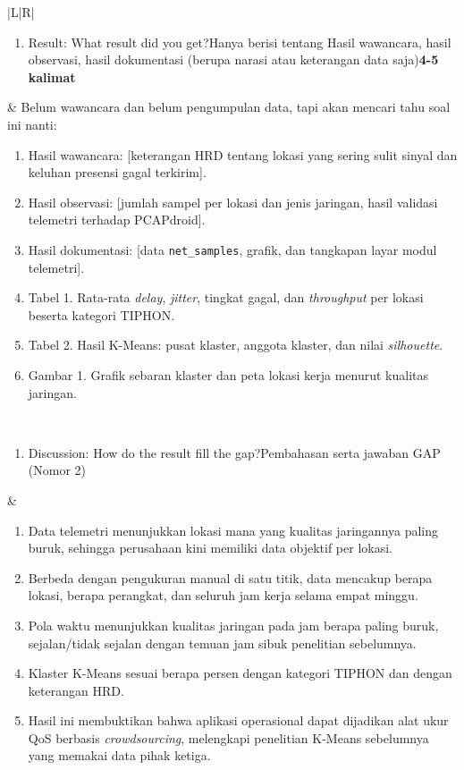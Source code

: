 \documentclass[11pt,a4paper]{article}
\begin{document}
\begin{longtable}{|L|R|}
\begin{enumerate}[label=\arabic*.,start=5]
\item Result: What result did you get?\newline Hanya berisi tentang Hasil wawancara, hasil observasi, hasil dokumentasi (berupa narasi atau keterangan data saja)\newline \textbf{4-5 kalimat}
\end{enumerate}
&
Belum wawancara dan belum pengumpulan data, tapi akan mencari tahu soal ini nanti:
\begin{enumerate}[label=\arabic*.]
\item Hasil wawancara: [keterangan HRD tentang lokasi yang sering sulit sinyal dan keluhan presensi gagal terkirim].
\item Hasil observasi: [jumlah sampel per lokasi dan jenis jaringan, hasil validasi telemetri terhadap PCAPdroid].
\item Hasil dokumentasi: [data \texttt{net\_samples}, grafik, dan tangkapan layar modul telemetri].
\item Tabel 1. Rata-rata \textit{delay}, \textit{jitter}, tingkat gagal, dan \textit{throughput} per lokasi beserta kategori TIPHON.
\item Tabel 2. Hasil K-Means: pusat klaster, anggota klaster, dan nilai \textit{silhouette}.
\item Gambar 1. Grafik sebaran klaster dan peta lokasi kerja menurut kualitas jaringan.
\end{enumerate}
\\ \hline

\begin{enumerate}[label=\arabic*.,start=6]
\item Discussion: How do the result fill the gap?\newline Pembahasan serta jawaban GAP (Nomor 2)
\end{enumerate}
&
\begin{enumerate}[label=\arabic*.]
\item Data telemetri menunjukkan lokasi mana yang kualitas jaringannya paling buruk, sehingga perusahaan kini memiliki data objektif per lokasi.
\item Berbeda dengan pengukuran manual di satu titik, data mencakup berapa lokasi, berapa perangkat, dan seluruh jam kerja selama empat minggu.
\item Pola waktu menunjukkan kualitas jaringan pada jam berapa paling buruk, sejalan/tidak sejalan dengan temuan jam sibuk penelitian sebelumnya.
\item Klaster K-Means sesuai berapa persen dengan kategori TIPHON dan dengan keterangan HRD.
\item Hasil ini membuktikan bahwa aplikasi operasional dapat dijadikan alat ukur QoS berbasis \textit{crowdsourcing}, melengkapi penelitian K-Means sebelumnya yang memakai data pihak ketiga.
\end{enumerate}
\\ \hline


\end{longtable}
\end{document}
